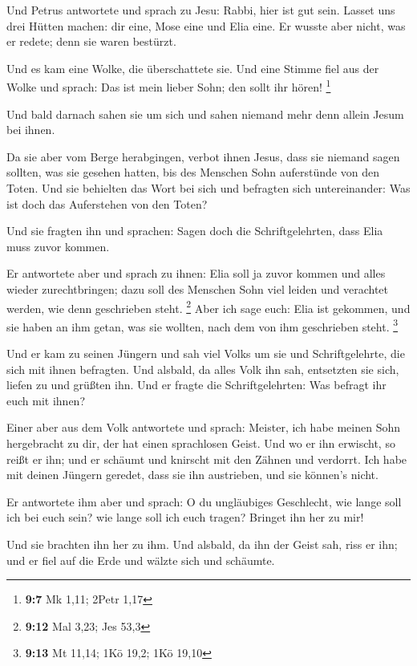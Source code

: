  Und Petrus antwortete und sprach zu Jesu: Rabbi, hier ist
gut sein. Lasset uns drei Hütten machen: dir eine, Mose eine und Elia
eine.  Er wusste aber nicht, was er redete; denn sie waren
bestürzt.

 Und es kam eine Wolke, die überschattete sie. Und eine
Stimme fiel aus der Wolke und sprach: Das ist mein lieber Sohn; den
sollt ihr hören! \footnote{\textbf{9:7} Mk 1,11; 2Petr 1,17}

 Und bald darnach sahen sie um sich und sahen niemand mehr
denn allein Jesum bei ihnen.

 Da sie aber vom Berge herabgingen, verbot ihnen Jesus,
dass sie niemand sagen sollten, was sie gesehen hatten, bis des Menschen
Sohn auferstünde von den Toten.  Und sie behielten das
Wort bei sich und befragten sich untereinander: Was ist doch das
Auferstehen von den Toten?

 Und sie fragten ihn und sprachen: Sagen doch die
Schriftgelehrten, dass Elia muss zuvor kommen.

 Er antwortete aber und sprach zu ihnen: Elia soll ja
zuvor kommen und alles wieder zurechtbringen; dazu soll des Menschen
Sohn viel leiden und verachtet werden, wie denn geschrieben steht.
\footnote{\textbf{9:12} Mal 3,23; Jes 53,3}  Aber ich
sage euch: Elia ist gekommen, und sie haben an ihm getan, was sie
wollten, nach dem von ihm geschrieben steht. \footnote{\textbf{9:13} Mt
  11,14; 1Kö 19,2; 1Kö 19,10}

 Und er kam zu seinen Jüngern und sah viel Volks um sie
und Schriftgelehrte, die sich mit ihnen befragten.  Und
alsbald, da alles Volk ihn sah, entsetzten sie sich, liefen zu und
grüßten ihn.  Und er fragte die Schriftgelehrten: Was
befragt ihr euch mit ihnen?

 Einer aber aus dem Volk antwortete und sprach: Meister,
ich habe meinen Sohn hergebracht zu dir, der hat einen sprachlosen
Geist.  Und wo er ihn erwischt, so reißt er ihn; und er
schäumt und knirscht mit den Zähnen und verdorrt. Ich habe mit deinen
Jüngern geredet, dass sie ihn austrieben, und sie können's nicht.

 Er antwortete ihm aber und sprach: O du ungläubiges
Geschlecht, wie lange soll ich bei euch sein? wie lange soll ich euch
tragen? Bringet ihn her zu mir!

 Und sie brachten ihn her zu ihm. Und alsbald, da ihn der
Geist sah, riss er ihn; und er fiel auf die Erde und wälzte sich und
schäumte.

